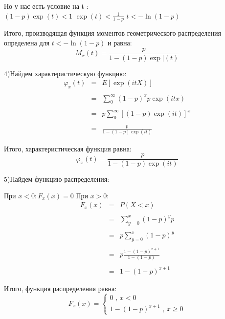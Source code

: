 \documentclass[a4paper,12pt, oneside]{article}
\begin{document}
Но у нас есть условие на t :\\
\vspace{\baselineskip}
$(1 - p)  \exp(t) < 1 $
\vspace{\baselineskip}
$\exp(t) < \frac{1}{1-p}$
\vspace{\baselineskip}
$t < -\ln(1-p)$


Итого, производящая функция моментов геометрического распределения определена для $t < -\ln(1-p)$ и равна:
$$
M_x(t) = \frac{p}{1-(1-p)\exp|(t)}
$$


\vspace{\baselineskip}
4)Найдем характеристическую функцию:
$$
\begin{array}{rcl}
\varphi_x(t) &=& E[\exp(itX)]\\
\\
&=&\sum\limits_{0}^{\infty} (1-p)^x p \exp(itx)\\
\\
&=&p \sum\limits_{0}^{\infty} [(1-p)\exp(it)]^x\\
\\
&=&\frac{p}{1-(1-p)\exp(it)}
\end{array}
$$

Итого, характеристическая функция равна:
$$
\varphi_x(t) = \frac{p}{1-(1-p)\exp(it)}
$$

\vspace{\baselineskip}
5)Найдем функцию распределения:

При $x < 0 : F_x(x) = 0$
При  $x > 0: $\\
$$
\begin{array}{rcl}
F_x(x) &=& P(X < x)\\
\\
&=&\sum\limits_{y=0}^x (1 - p)^y p\\
\\
&=&p \sum\limits_{y=0}^x (1 - p)^y\\
\\
&=&p \frac{1 - (1 - p)^{x + 1}}{1 - (1 - p)}\\
\\
&=& 1 - (1 - p)^{x + 1}
\end{array}
$$

Итого, функция распределения равна:
\begin{equation*}
F_x(x) = 
\begin{cases}
0 \text{	,    $x < 0$}\\
1 - (1 - p)^{x + 1} \text{		,      $x \ge 0$}
\end{cases}
\end{equation*}
\end{document}
